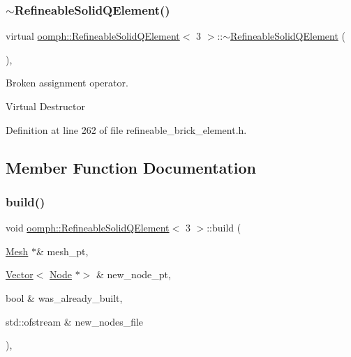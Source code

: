 \subsubsection{\texorpdfstring{$\sim$\+Refineable\+Solid\+Q\+Element()}{~RefineableSolidQElement()}}
{\footnotesize\ttfamily virtual \hyperlink{classoomph_1_1RefineableSolidQElement}{oomph\+::\+Refineable\+Solid\+Q\+Element}$<$ 3 $>$\+::$\sim$\hyperlink{classoomph_1_1RefineableSolidQElement}{Refineable\+Solid\+Q\+Element} (\begin{DoxyParamCaption}{ }\end{DoxyParamCaption})\hspace{0.3cm}{\ttfamily [inline]}, {\ttfamily [virtual]}}



Broken assignment operator. 

Virtual Destructor 

Definition at line 262 of file refineable\+\_\+brick\+\_\+element.\+h.



\subsection{Member Function Documentation}
\mbox{\label{classoomph_1_1RefineableSolidQElement_3_013_01_4_a62db84d609d99537e4180bf897a81a9b}} 
\subsubsection{\texorpdfstring{build()}{build()}}
{\footnotesize\ttfamily void \hyperlink{classoomph_1_1RefineableSolidQElement}{oomph\+::\+Refineable\+Solid\+Q\+Element}$<$ 3 $>$\+::build (\begin{DoxyParamCaption}\item[{\hyperlink{classoomph_1_1Mesh}{Mesh} $\ast$\&}]{mesh\+\_\+pt,  }\item[{\hyperlink{classoomph_1_1Vector}{Vector}$<$ \hyperlink{classoomph_1_1Node}{Node} $\ast$$>$ \&}]{new\+\_\+node\+\_\+pt,  }\item[{bool \&}]{was\+\_\+already\+\_\+built,  }\item[{std\+::ofstream \&}]{new\+\_\+nodes\+\_\+file }\end{DoxyParamCaption})\hspace{0.3cm}{\ttfamily [inline]}, {\ttfamily [virtual]}}



